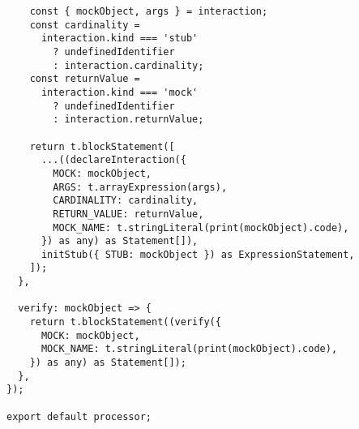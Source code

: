 \begin{verbatim}
    const { mockObject, args } = interaction;
    const cardinality =
      interaction.kind === 'stub'
        ? undefinedIdentifier
        : interaction.cardinality;
    const returnValue =
      interaction.kind === 'mock'
        ? undefinedIdentifier
        : interaction.returnValue;

    return t.blockStatement([
      ...((declareInteraction({
        MOCK: mockObject,
        ARGS: t.arrayExpression(args),
        CARDINALITY: cardinality,
        RETURN_VALUE: returnValue,
        MOCK_NAME: t.stringLiteral(print(mockObject).code),
      }) as any) as Statement[]),
      initStub({ STUB: mockObject }) as ExpressionStatement,
    ]);
  },

  verify: mockObject => {
    return t.blockStatement((verify({
      MOCK: mockObject,
      MOCK_NAME: t.stringLiteral(print(mockObject).code),
    }) as any) as Statement[]);
  },
});

export default processor;
\end{verbatim}
